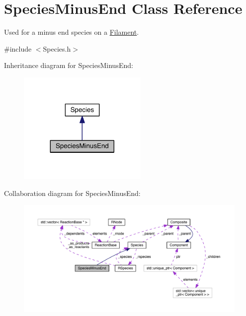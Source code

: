 \hypertarget{classSpeciesMinusEnd}{\section{Species\+Minus\+End Class Reference}
\label{classSpeciesMinusEnd}
}


Used for a minus end species on a \hyperlink{classFilament}{Filament}.  




{\ttfamily \#include $<$Species.\+h$>$}



Inheritance diagram for Species\+Minus\+End\+:\nopagebreak
\begin{figure}[H]
\begin{center}
\leavevmode
\includegraphics[width=176pt]{classSpeciesMinusEnd__inherit__graph}
\end{center}
\end{figure}


Collaboration diagram for Species\+Minus\+End\+:
\nopagebreak
\begin{figure}[H]
\begin{center}
\leavevmode
\includegraphics[width=350pt]{classSpeciesMinusEnd__coll__graph}
\end{center}
\end{figure}
